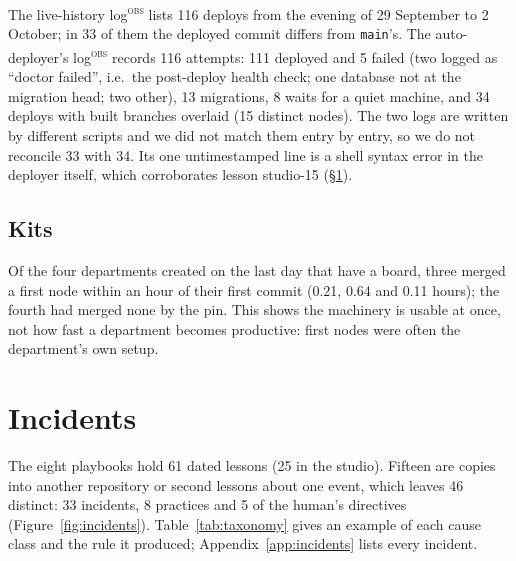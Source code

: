 \documentclass[11pt]{article}
\newcommand{\code}[1]{\texttt{#1}}
\newcommand{\obs}{\textsuperscript{\textsc{obs}}}
\begin{document}
The live-history log\obs{} lists 116 deploys from the evening of 29 September to 2 %
October; in 33 of them the deployed commit differs from \code{main}'s. The %
auto-deployer's log\obs{} records 116 attempts: 111 deployed and 5 failed (two logged as %
``doctor failed'', i.e.\ the post-deploy health check; one database not at the migration
head; two other), 13 migrations, 8 waits for a quiet machine, and 34 deploys with built %
branches overlaid (15 distinct nodes). The two logs are written by different scripts and
we did not match them entry by entry, so we do not reconcile 33 with 34. Its one untimestamped line is a shell syntax error in the %
deployer itself, which corroborates lesson studio-15 (\S\ref{sec:incidents}).

\subsection{Kits}
Of the four departments created on the last day that have a board, three %
merged a first node within an hour of their first commit (0.21, 0.64 and 0.11 hours); %
the fourth had merged none by the pin. This shows the machinery is usable at once, not
how fast a department becomes productive: first nodes were often the department's own
setup.

\section{Incidents}\label{sec:incidents}

The eight playbooks hold 61 dated lessons (25 in the studio). Fifteen are copies into %
another repository or second lessons about one event, which leaves 46 distinct: 33 %
incidents, 8 practices and 5 of the human's directives (Figure~\ref{fig:incidents}).
Table~\ref{tab:taxonomy} gives an example of each cause class and the rule it produced;
Appendix~\ref{app:incidents} lists every incident.
\end{document}
